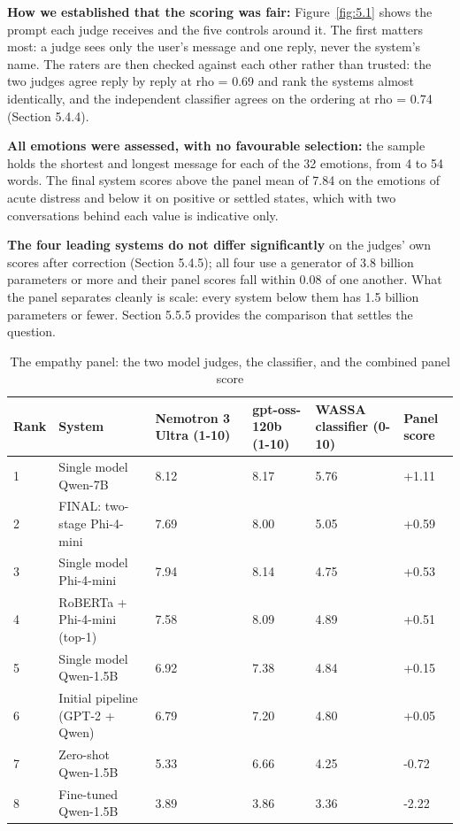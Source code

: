 \textbf{How we established that the scoring was fair:} Figure~\ref{fig:5.1} shows the prompt each judge receives and the five controls around it. The first matters most: a judge sees only the user's message and one reply, never the system's name. The raters are then checked against each other rather than trusted: the two judges agree reply by reply at rho = 0.69 and rank the systems almost identically, and the independent classifier agrees on the ordering at rho = 0.74 (Section 5.4.4).

\textbf{All emotions were assessed, with no favourable selection:} the sample holds the shortest and longest message for each of the 32 emotions, from 4 to 54 words. The final system scores above the panel mean of 7.84 on the emotions of acute distress and below it on positive or settled states, which with two conversations behind each value is indicative only.

\textbf{The four leading systems do not differ significantly} on the judges' own scores after correction (Section 5.4.5); all four use a generator of 3.8 billion parameters or more and their panel scores fall within 0.08 of one another. What the panel separates cleanly is scale: every system below them has 1.5 billion parameters or fewer. Section 5.5.5 provides the comparison that settles the question.

\begin{table}[H]
\centering
\scriptsize
\begin{tabularx}{\textwidth}{@{}lXXXXX@{}}
\toprule
\textbf{Rank} & \textbf{System} & \textbf{Nemotron 3 Ultra (1-10)} & \textbf{gpt-oss-120b (1-10)} & \textbf{WASSA classifier (0-10)} & \textbf{Panel score} \\
\midrule
1 & Single model Qwen-7B & 8.12 & 8.17 & 5.76 & +1.11 \\
2 & FINAL: two-stage Phi-4-mini & 7.69 & 8.00 & 5.05 & +0.59 \\
3 & Single model Phi-4-mini & 7.94 & 8.14 & 4.75 & +0.53 \\
4 & RoBERTa + Phi-4-mini (top-1) & 7.58 & 8.09 & 4.89 & +0.51 \\
5 & Single model Qwen-1.5B & 6.92 & 7.38 & 4.84 & +0.15 \\
6 & Initial pipeline (GPT-2 + Qwen) & 6.79 & 7.20 & 4.80 & +0.05 \\
7 & Zero-shot Qwen-1.5B & 5.33 & 6.66 & 4.25 & -0.72 \\
8 & Fine-tuned Qwen-1.5B & 3.89 & 3.86 & 3.36 & -2.22 \\
\bottomrule
\end{tabularx}
\caption{The empathy panel: the two model judges, the classifier, and the combined panel score}
\label{tab:5.2}
\end{table}

